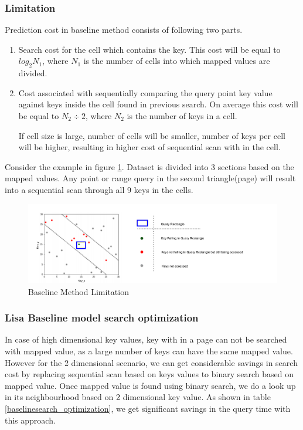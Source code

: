 \subsubsection{Limitation}

Prediction cost in baseline method consists of following two parts.

\begin{enumerate}
	\item Search cost for the cell which contains the key. This cost will be equal to $log_{2}N_{1}$, where $N_{1}$ is the number of cells into which mapped values are divided.
	
	\item Cost associated with sequentially comparing the query point key value against keys inside the cell found in previous search. On average this cost will be equal to $N_{2}\div2$, where $N_{2}$ is the number of keys in a cell.   
	
If cell size is large, number of cells will be smaller, number of keys per cell will be higher, resulting in higher cost of sequential scan with in the cell. 
\end{enumerate}
Consider the example in figure \ref{fig:BaseLine_Method_Limitation}. Dataset is divided into 3 sections based on the mapped values. Any point or range query in the second triangle(page) will result into a sequential scan through all 9 keys in the cells.

\begin{figure}[t]
    \centering
    \includegraphics[width=1.3\textwidth]{graphs/Baseline_limitation.pdf}
    \caption{Baseline Method Limitation }
    \label{fig:BaseLine_Method_Limitation}
\end{figure}



\subsubsection {Lisa Baseline model search optimization}
In case of high dimensional key values, key with in a page can not be searched with mapped value, as a large number of keys can have the same mapped value. However for the 2 dimensional scenario, we can get considerable savings in search cost by replacing sequential scan based on keys values to binary search based on mapped value. Once mapped value is found using binary search, we do a look up in its neighbourhood based on 2 dimensional key value. As shown in table \ref{baselinesearch_optimization}, we get significant savings in the query time with this approach.

